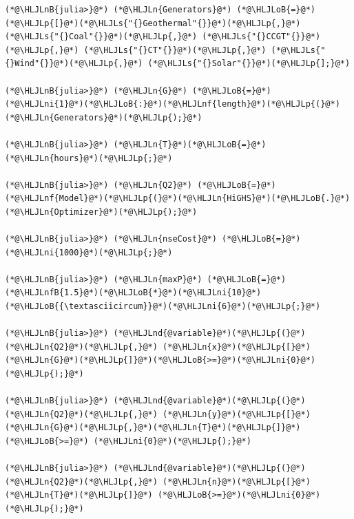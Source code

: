 \documentclass[12pt,a4paper]{article}
\newcommand{\HLJLn}[1]{#1}
\newcommand{\HLJLnd}[1]{\textcolor[RGB]{214,102,97}{#1}}
\newcommand{\HLJLnf}[1]{\textcolor[RGB]{66,102,213}{#1}}
\newcommand{\HLJLs}[1]{\textcolor[RGB]{201,61,57}{#1}}
\newcommand{\HLJLnB}[1]{\textcolor[RGB]{59,151,46}{#1}}
\newcommand{\HLJLnfB}[1]{\textcolor[RGB]{59,151,46}{#1}}
\newcommand{\HLJLni}[1]{\textcolor[RGB]{59,151,46}{#1}}
\newcommand{\HLJLoB}[1]{\textcolor[RGB]{102,102,102}{\textbf{#1}}}
\newcommand{\HLJLp}[1]{#1}
\begin{document}
\begin{lstlisting}
(*@\HLJLnB{julia>}@*) (*@\HLJLn{Generators}@*) (*@\HLJLoB{=}@*) (*@\HLJLp{[}@*)(*@\HLJLs{"{}Geothermal"{}}@*)(*@\HLJLp{,}@*) (*@\HLJLs{"{}Coal"{}}@*)(*@\HLJLp{,}@*) (*@\HLJLs{"{}CCGT"{}}@*)(*@\HLJLp{,}@*) (*@\HLJLs{"{}CT"{}}@*)(*@\HLJLp{,}@*) (*@\HLJLs{"{}Wind"{}}@*)(*@\HLJLp{,}@*) (*@\HLJLs{"{}Solar"{}}@*)(*@\HLJLp{];}@*)

(*@\HLJLnB{julia>}@*) (*@\HLJLn{G}@*) (*@\HLJLoB{=}@*) (*@\HLJLni{1}@*)(*@\HLJLoB{:}@*)(*@\HLJLnf{length}@*)(*@\HLJLp{(}@*)(*@\HLJLn{Generators}@*)(*@\HLJLp{);}@*)

(*@\HLJLnB{julia>}@*) (*@\HLJLn{T}@*)(*@\HLJLoB{=}@*) (*@\HLJLn{hours}@*)(*@\HLJLp{;}@*)

(*@\HLJLnB{julia>}@*) (*@\HLJLn{Q2}@*) (*@\HLJLoB{=}@*) (*@\HLJLnf{Model}@*)(*@\HLJLp{(}@*)(*@\HLJLn{HiGHS}@*)(*@\HLJLoB{.}@*)(*@\HLJLn{Optimizer}@*)(*@\HLJLp{);}@*)

(*@\HLJLnB{julia>}@*) (*@\HLJLn{nseCost}@*) (*@\HLJLoB{=}@*) (*@\HLJLni{1000}@*)(*@\HLJLp{;}@*)

(*@\HLJLnB{julia>}@*) (*@\HLJLn{maxP}@*) (*@\HLJLoB{=}@*) (*@\HLJLnfB{1.5}@*)(*@\HLJLoB{*}@*)(*@\HLJLni{10}@*)(*@\HLJLoB{{\textasciicircum}}@*)(*@\HLJLni{6}@*)(*@\HLJLp{;}@*)

(*@\HLJLnB{julia>}@*) (*@\HLJLnd{@variable}@*)(*@\HLJLp{(}@*)(*@\HLJLn{Q2}@*)(*@\HLJLp{,}@*) (*@\HLJLn{x}@*)(*@\HLJLp{[}@*)(*@\HLJLn{G}@*)(*@\HLJLp{]}@*)(*@\HLJLoB{>=}@*)(*@\HLJLni{0}@*)(*@\HLJLp{);}@*)

(*@\HLJLnB{julia>}@*) (*@\HLJLnd{@variable}@*)(*@\HLJLp{(}@*)(*@\HLJLn{Q2}@*)(*@\HLJLp{,}@*) (*@\HLJLn{y}@*)(*@\HLJLp{[}@*)(*@\HLJLn{G}@*)(*@\HLJLp{,}@*)(*@\HLJLn{T}@*)(*@\HLJLp{]}@*) (*@\HLJLoB{>=}@*) (*@\HLJLni{0}@*)(*@\HLJLp{);}@*)

(*@\HLJLnB{julia>}@*) (*@\HLJLnd{@variable}@*)(*@\HLJLp{(}@*)(*@\HLJLn{Q2}@*)(*@\HLJLp{,}@*) (*@\HLJLn{n}@*)(*@\HLJLp{[}@*)(*@\HLJLn{T}@*)(*@\HLJLp{]}@*) (*@\HLJLoB{>=}@*)(*@\HLJLni{0}@*)(*@\HLJLp{);}@*)


\end{lstlisting}
\end{document}
